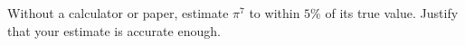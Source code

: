 Without a calculator or paper, estimate $\pi^7$ to within $5\%$ of its true value. Justify that your estimate is accurate enough.

